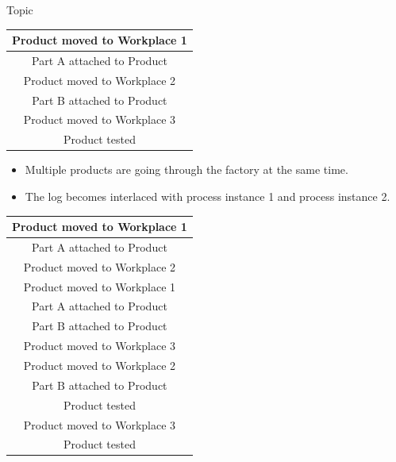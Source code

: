 \documentclass[final,xcolor={usenames,x11names}]{beamer}
\newlength{\halfcolwid}
\begin{document}
\begin{frame}[t]
\begin{columns}[t]
\begin{column}{\halfcolwid}
\begin{alertblock}{Topic}
\begin{center}
{
\ttfamily
\begin{tabular}{|c|}
  \hline
  \cellcolor{PaleTurquoise1}
Product moved to Workplace 1
  \\
  \hline
  \cellcolor{PaleTurquoise1}
Part A attached to Product
  \\
  \hline
  \cellcolor{PaleTurquoise1}
Product moved to Workplace 2
  \\
  \hline
  \cellcolor{PaleTurquoise1}
Part B attached to Product
  \\
  \hline
  \cellcolor{PaleTurquoise1}
Product moved to Workplace 3
  \\
  \hline
  \cellcolor{PaleTurquoise1}
Product tested
  \\
  \hline
\end{tabular}
}
\end{center}

\begin{itemize}
\item Multiple products are going through the factory at the same time.
\item The log becomes interlaced with \colorbox{PaleTurquoise1}{process instance 1} and \colorbox{PaleTurquoise1>wheel,1,5}{process instance 2}.
\end{itemize}

\begin{center}
{
\ttfamily
\begin{tabular}{|c|}
  \hline
  \cellcolor{PaleTurquoise1}
Product moved to Workplace 1
  \\
  \hline
  \cellcolor{PaleTurquoise1}
Part A attached to Product
  \\
  \hline
  \cellcolor{PaleTurquoise1}
Product moved to Workplace 2
  \\
  \hline
  \cellcolor{PaleTurquoise1>wheel,1,5}
Product moved to Workplace 1
  \\
  \hline
  \cellcolor{PaleTurquoise1>wheel,1,5}
Part A attached to Product
  \\
  \hline
  \cellcolor{PaleTurquoise1}
Part B attached to Product
  \\
  \hline
  \cellcolor{PaleTurquoise1}
Product moved to Workplace 3
  \\
  \hline
  \cellcolor{PaleTurquoise1>wheel,1,5}
Product moved to Workplace 2
  \\
  \hline
  \cellcolor{PaleTurquoise1>wheel,1,5}
Part B attached to Product
  \\
  \hline
  \cellcolor{PaleTurquoise1}
Product tested
  \\
  \hline
  \cellcolor{PaleTurquoise1>wheel,1,5}
Product moved to Workplace 3
  \\
  \hline
  \cellcolor{PaleTurquoise1>wheel,1,5}
Product tested
  \\
  \hline
\end{tabular}
}
\end{center}


\end{alertblock}
\end{column}
\end{columns}
\end{frame}
\end{document}
